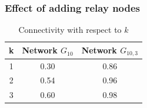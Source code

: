 \documentclass{beamer}
\begin{document}
\begin{frame}
\frametitle{Effect of adding relay nodes}

\begin{table}[!htb]
  \centering
 \begin{minipage}{.5\linewidth}
     \begin{tabular}{|c|c|c|}
     \hline
     k & Network $G_{10}$ & Network $G_{10,3}$  \\
     \hline
      1 & 0.30 & 0.86 \\\hline
	  2 & 0.54 & 0.96\\\hline
	  3 &0.60 & 0.98 \\\hline
\end{tabular}
    \end{minipage}
     \caption{Connectivity with respect to $k$}
      \label{Tab:SRC}   
\end{table}
\end{frame}
\end{document}
